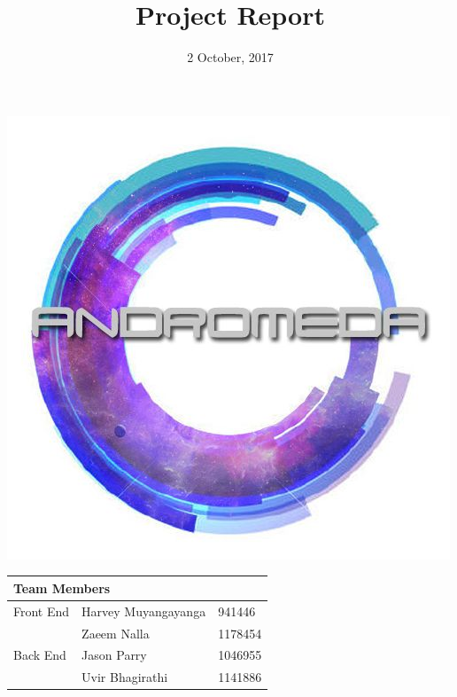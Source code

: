 \documentclass{article}
\begin{document}
\begin{titlepage}
\title{\textbf{\Huge Project Report}}
\date{\large 2 October, 2017}
\bigskip
\bigskip
\maketitle
\thispagestyle{empty}
\centerline{\includegraphics[scale=0.65]{AndromedaLogo}}

\begin{table}
\Large
\begin{center}
\begin{tabular}{|m{5cm}|m{5cm}|m{5cm}|}
\hline
\multicolumn{3}{|m{10cm}|}{\textbf{Team Members}\centering} \\
\hline
\hline
Front End & Harvey Muyangayanga & 941446\\
 & Zaeem Nalla & 1178454\\
 \hline
Back End & Jason Parry & 1046955\\
 & Uvir Bhagirathi & 1141886\\
\hline
\end{tabular}
\end{center}
\end{table}

\end{titlepage}

\tableofcontents
{}
\cleardoublepage{}
\pagebreak
\end{document}
